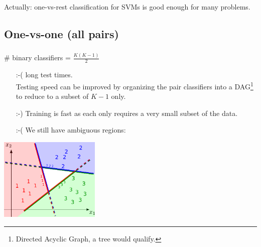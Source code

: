 \begin{frame}
{Actually: one-vs-rest classification for SVMs is good enough for many problems.
}

    
\end{frame}


\subsection{One-vs-one (all pairs)}

\begin{frame}\frametitle{\subsecname}

\# binary classifiers = $\frac{K(K-1)}{2}$ 

\begin{itemize}
\item[:-(] long test times.\\
    Testing speed can be improved by organizing the pair classifiers into a DAG\footnote{Directed Acyclic Graph, a tree would qualify.} to reduce to a subset of $K-1$ only.
\item[:-)] Training is fast as each only requires a very small subset of the data. 
\item[:-(] We still have ambiguous regions:    
\end{itemize}

\begin{center}
	 \includegraphics[width=4.8cm]{img/3classes_onevsone_majority}
	 \label{fig:onevsone}
\end{center}
    
\end{frame}

